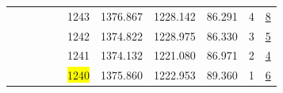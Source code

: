 \begin{table}[h]
{\begin{tabular}{l@{\hskip 0.1in}c@{\hskip 0.1in}c@{\hskip 0.1in}c@{\hskip 0.1in}c@{\hskip 0.1in}c@{\hskip 0.1in}c@{\hskip 0.1in}c@{\hskip 0.1in}c@{\hskip 0.1in}c@{\hskip 0.1in}c@{\hskip 0.1in}}
&  &  &  &  & 1243 & 1376.867 & 1228.142 & 86.291 & 4 & \underline{8}\\
&  &  &  &  & 1242 & 1374.822 & 1228.975 & 86.330 & 3 & \underline{5}\\
&  &  &  &  & 1241 & 1374.132 & 1221.080 & 86.971 & 2 & \underline{4}\\
&  &  &  &  & \colorbox{yellow}{1240} & 1375.860 & 1222.953 & 89.360 & 1 & \underline{6}\\
\bottomrule
\end{tabular}}
\label{tab:resultNotCalendar}
\end{table}